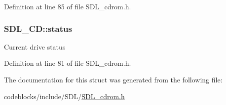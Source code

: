 Definition at line 85 of file S\+D\+L\+\_\+cdrom.\+h.

\hypertarget{structSDL__CD_afaab8559e9b75bbf501b31b5f5f01a9b}{
\subsubsection[{status}]{ S\+D\+L\+\_\+\+C\+D\+::status}}\label{structSDL__CD_afaab8559e9b75bbf501b31b5f5f01a9b}
Current drive status 

Definition at line 81 of file S\+D\+L\+\_\+cdrom.\+h.



The documentation for this struct was generated from the following file\+:\begin{DoxyCompactItemize}
\item 
codeblocks/include/\+S\+D\+L/\hyperlink{SDL__cdrom_8h}{S\+D\+L\+\_\+cdrom.\+h}\end{DoxyCompactItemize}
